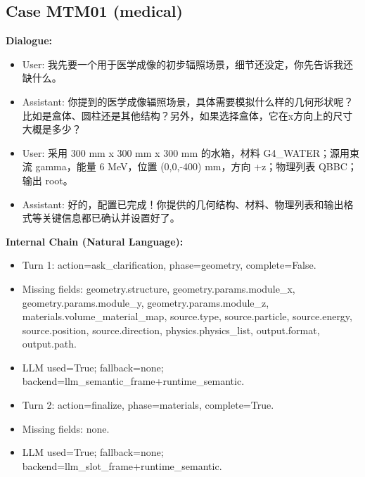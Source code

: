 \documentclass[11pt]{ctexart}
\begin{document}
\subsection{Case MTM01 (medical)}
\textbf{Dialogue:}
\begin{itemize}
\item User: 我先要一个用于医学成像的初步辐照场景，细节还没定，你先告诉我还缺什么。
\item Assistant: 你提到的医学成像辐照场景，具体需要模拟什么样的几何形状呢？比如是盒体、圆柱还是其他结构？另外，如果选择盒体，它在x方向上的尺寸大概是多少？
\item User: 采用 300 mm x 300 mm x 300 mm 的水箱，材料 G4\_WATER；源用束流 gamma，能量 6 MeV，位置 (0,0,-400) mm，方向 +z；物理列表 QBBC；输出 root。
\item Assistant: 好的，配置已完成！你提供的几何结构、材料、物理列表和输出格式等关键信息都已确认并设置好了。
\end{itemize}
\textbf{Internal Chain (Natural Language):}
\begin{itemize}
\item Turn 1: action=ask\_clarification, phase=geometry, complete=False.
\item Missing fields: geometry.structure, geometry.params.module\_x, geometry.params.module\_y, geometry.params.module\_z, materials.volume\_material\_map, source.type, source.particle, source.energy, source.position, source.direction, physics.physics\_list, output.format, output.path.
\item LLM used=True; fallback=none; backend=llm\_semantic\_frame+runtime\_semantic.
\item Turn 2: action=finalize, phase=materials, complete=True.
\item Missing fields: none.
\item LLM used=True; fallback=none; backend=llm\_slot\_frame+runtime\_semantic.
\end{itemize}
\end{document}
